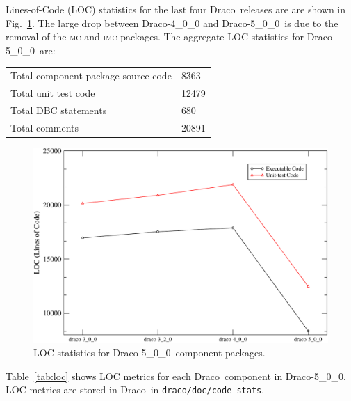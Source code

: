 \documentclass[note]{ResearchNote_pdf}
\newcommand{\draco}{Draco}
\newcommand{\dracor}{\draco-5\_0\_0}
\begin{document}
Lines-of-Code (LOC) statistics for the last four \draco\ releases are
are shown in Fig.~\ref{fig:stats}.  The large drop between
\draco-4\_0\_0 and \dracor\ is due to the removal of the \textsc{mc}
and \textsc{imc} packages. The aggregate LOC statistics for \dracor\ 
are:
\begin{center}
  \begin{tabular}{|l|l|} \hline
    Total component package source code & 8363 \\
    Total unit test code & 12479 \\
    Total DBC statements & 680 \\
    Total comments & 20891 \\
    \hline
  \end{tabular}
\end{center}
\begin{figure}
  \label{fig:stats}
  \centerline{
    \includegraphics[width=6in]{loc-5_0_0}}
  \caption{LOC statistics for \dracor\ component packages.}
\end{figure}
Table~\ref{tab:loc} shows LOC metrics for each \draco\ component in
\dracor.  LOC metrics are stored in \draco\ in
\texttt{draco/doc/code\_stats}.
\end{document}
